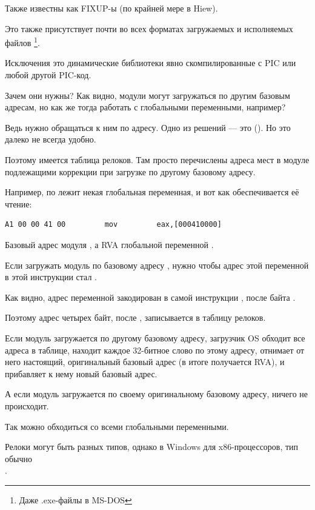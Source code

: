 \label{subsec:relocs}

Также известны как FIXUP-ы (по крайней мере в Hiew).

Это также присутствует почти во всех форматах загружаемых и исполняемых файлов
\footnote{Даже .exe-файлы в MS-DOS}.

Исключения это динамические библиотеки явно скомпилированные с \ac{PIC} или любой другой \ac{PIC}-код.

Зачем они нужны?
Как видно, модули могут загружаться по другим базовым адресам,
но как же тогда работать с глобальными переменными, например?

Ведь нужно обращаться к ним по адресу.
Одно из решений --- это \PICcode{} ().  Но это далеко не всегда удобно.

Поэтому имеется таблица релоков. 
Там просто перечислены адреса мест в модуле подлежащими коррекции при загрузке по другому базовому адресу.

Например, по  лежит некая глобальная переменная, и вот как обеспечивается её чтение:

\begin{lstlisting}
A1 00 00 41 00         mov         eax,[000410000]
\end{lstlisting}

Базовый адрес модуля , а \ac{RVA} глобальной переменной .

Если загружать модуль по базовому адресу , нужно чтобы адрес этой переменной в этой инструкции стал .

Как видно, адрес переменной закодирован в самой инструкции , после байта .

Поэтому адрес четырех байт, после , записывается в таблицу релоков.

Если модуль загружается по другому базовому адресу,
загрузчик \ac{OS} обходит все адреса в таблице, 
находит каждое 32-битное слово по этому адресу,
отнимает от него настоящий, оригинальный базовый адрес
(в итоге получается \ac{RVA}), и прибавляет к нему новый базовый адрес.

А если модуль загружается по своему оригинальному базовому адресу, ничего не происходит.

Так можно обходиться со всеми глобальными переменными.

Релоки могут быть разных типов, однако в Windows для x86-процессоров, тип обычно \\
.

